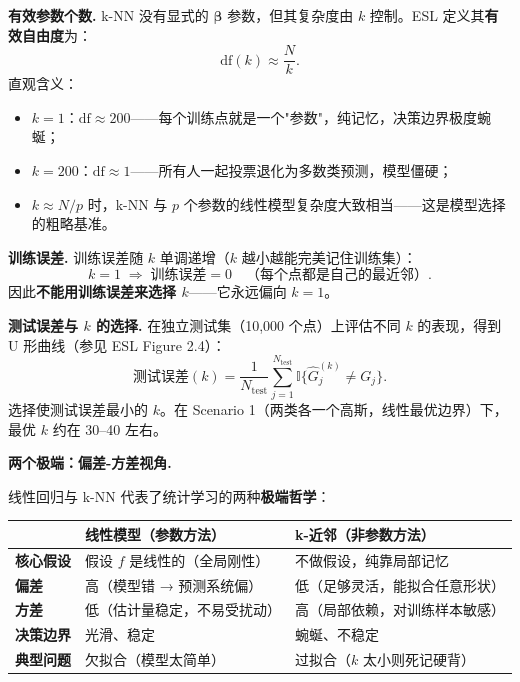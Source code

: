 \textbf{有效参数个数.}
k-NN 没有显式的 $\bm{\beta}$ 参数，但其复杂度由 $k$ 控制。ESL 定义其\textbf{有效自由度}为：
\begin{equation}\label{eq:knn_df}
    \mathrm{df}(k) \approx \frac{N}{k}.
\end{equation}
直观含义：
\begin{itemize}
    \item $k = 1$：$\mathrm{df} \approx 200$——每个训练点就是一个"参数"，纯记忆，决策边界极度蜿蜒；
    \item $k = 200$：$\mathrm{df} \approx 1$——所有人一起投票退化为多数类预测，模型僵硬；
    \item $k \approx N/p$ 时，k-NN 与 $p$ 个参数的线性模型复杂度大致相当——这是模型选择的粗略基准。
\end{itemize}

\textbf{训练误差.}
训练误差随 $k$ 单调递增（$k$ 越小越能完美记住训练集）：
\[
k = 1 \;\Rightarrow\; \text{训练误差} = 0
\quad\text{（每个点都是自己的最近邻）}.
\]
因此\textbf{不能用训练误差来选择 $k$}——它永远偏向 $k = 1$。

\textbf{测试误差与 $k$ 的选择.}
在独立测试集（10,000 个点）上评估不同 $k$ 的表现，得到 U 形曲线（参见 ESL Figure 2.4）：
\[
\text{测试误差}(k) = \frac{1}{N_{\mathrm{test}}}\sum_{j=1}^{N_{\mathrm{test}}} \mathbb{I}\{\hat{G}_j^{(k)} \neq G_j\}.
\]
选择使测试误差最小的 $k$。在 Scenario 1（两类各一个高斯，线性最优边界）下，最优 $k$ 约在 30--40 左右。

\medskip
\textbf{两个极端：偏差-方差视角.}

线性回归与 k-NN 代表了统计学习的两种\textbf{极端哲学}：

\begin{center}
\renewcommand{\arraystretch}{1.8}
\begin{tabular}{p{2.5cm}|p{5.5cm}|p{5.5cm}}
\toprule
& \textbf{线性模型（参数方法）} & \textbf{k-近邻（非参数方法）} \\
\midrule
\textbf{核心假设} & 假设 $f$ 是线性的（全局刚性） & 不做假设，纯靠局部记忆 \\
\textbf{偏差} & 高（模型错 → 预测系统偏） & 低（足够灵活，能拟合任意形状） \\
\textbf{方差} & 低（估计量稳定，不易受扰动） & 高（局部依赖，对训练样本敏感） \\
\textbf{决策边界} & 光滑、稳定 & 蜿蜒、不稳定 \\
\textbf{典型问题} & 欠拟合（模型太简单） & 过拟合（$k$ 太小则死记硬背） \\
\bottomrule
\end{tabular}
\end{center}


